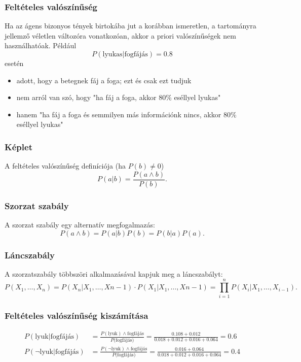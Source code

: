 \subsubsection{Feltételes valószínűség}

Ha az ágens bizonyos tények birtokába jut a korábban ismeretlen, a tartományra
jellemző véletlen változóra vonatkozóan, akkor a priori valószínűségek nem
használhatóak. Például \[
    P(\text{lyukas} | \text{fogfájás}) = 0.8
\]  esetén
\begin{itemize}
    \item adott, hogy a betegnek fáj a foga; ezt és csak ezt tudjuk
    \item nem arról van szó, hogy "ha fáj a foga, akkor 80\% eséllyel lyukas"
    \item hanem "ha fáj a foga és semmilyen más információnk nincs, akkor 80\%
        eséllyel lyukas"
\end{itemize}

\subsubsection{Képlet}

A feltételes valószínűség definíciója (ha $P(b) \neq 0$) \[
    P(a|b) = \frac{P(a \land b)}{P(b)}
.\]

\subsubsection{Szorzat szabály}

A szorzat szabály egy alternatív megfogalmazás:
\[
    P(a \land b) = P(a|b)P(b) = P(b|a)P(a)
.\]

\subsubsection{Láncszabály}

A szorzatszabály többszöri alkalmazásával kapjuk meg a láncszabályt:
\[
    P(X_1, \ldots, X_n) =
    P(X_n | X_1, \ldots, X{n-1}) \cdot P(X_1 | X_1, \ldots, X{n-1})
    = \prod^n_{i=1}P(X_i | X_1, \ldots, X_{i-1})
.\]

\subsubsection{Feltételes valószínűség kiszámítása}

\begin{align*}
    P(\text{lyuk}|\text{fogfájás}) &= \frac{P(\text{lyuk}) \land
        \text{fogfájás}}{P(\text{fogfájás)}} =
        \frac{0.108 + 0.012}{0.018+0.012+0.016+0.064} = 0.6 \\
    P(\lnot \text{lyuk}|\text{fogfájás}) &= \frac{P(\lnot \text{lyuk}) \land
        \text{fogfájás}}{P(\text{fogfájás)}} =
        \frac{0.016 + 0.064}{0.018+0.012+0.016+0.064} = 0.4
\end{align*}
